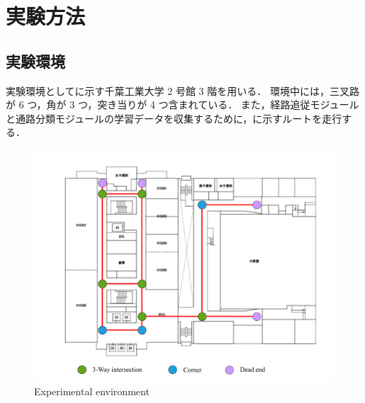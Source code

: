 \newpage
\section{実験方法}
\subsection{実験環境}
実験環境としてに示す千葉工業大学 2 号館 3 階を用いる．
環境中には，三叉路が 6 つ，角が 3 つ，突き当りが 4 つ含まれている．
また，経路追従モジュールと通路分類モジュールの学習データを収集するために，に示すルートを走行する．

\begin{figure}[h]
  \centering
  \includegraphics[width=130mm]{images/pdf/ishiguro/topo.pdf}
  \caption{Experimental environment}
  \label{fig:topo}
\end{figure}

